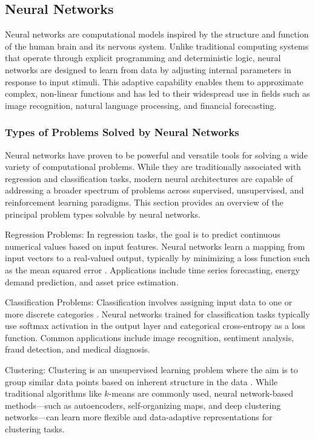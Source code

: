 \subsection{Neural Networks}
Neural networks are computational models inspired by the structure and function of the human brain and its nervous system. Unlike traditional computing systems that operate through explicit programming and deterministic logic, neural networks are designed to learn from data by adjusting internal parameters in response to input stimuli. This adaptive capability enables them to approximate complex, non-linear functions and has led to their widespread use in fields such as image recognition, natural language processing, and financial forecasting.

\subsubsection{Types of Problems Solved by Neural Networks}
Neural networks have proven to be powerful and versatile tools for solving a wide variety of computational problems. While they are traditionally associated with regression and classification tasks, modern neural architectures are capable of addressing a broader spectrum of problems across supervised, unsupervised, and reinforcement learning paradigms. This section provides an overview of the principal problem types solvable by neural networks.

Regression Problems: In regression tasks, the goal is to predict continuous numerical values based on input features. Neural networks learn a mapping from input vectors to a real-valued output, typically by minimizing a loss function such as the mean squared error \parencite[p.~99]{goodfellow2016deeplearning}. Applications include time series forecasting, energy demand prediction, and asset price estimation. 

Classification Problems: Classification involves assigning input data to one or more discrete categories \parencite[p.~98]{goodfellow2016deeplearning}. Neural networks trained for classification tasks typically use softmax activation in the output layer and categorical cross-entropy as a loss function. Common applications include image recognition, sentiment analysis, fraud detection, and medical diagnosis.

Clustering: Clustering is an unsupervised learning problem where the aim is to group similar data points based on inherent structure in the data \parencite{aljalbout2018clustering}. While traditional algorithms like $k$-means are commonly used, neural network-based methods—such as autoencoders, self-organizing maps, and deep clustering networks—can learn more flexible and data-adaptive representations for clustering tasks.

